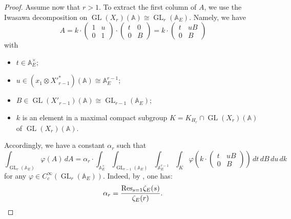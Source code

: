 \documentclass[10pt]{amsart}
\theoremstyle{plain}
\numberwithin{equation}{section}
\begin{document}
\begin{proof}
Assume now that $r>1$. To extract the first column of $A$, we  use the Iwasawa
decomposition on ${\operatorname{GL}}(X_r)({\mathbb{A}})\cong {\operatorname{GL}}_r({\mathbb{A}}_E)$. Namely, we have
  \[   
A = k \cdot\begin{pmatrix}
  1 & u \\
  0 & 1 \end{pmatrix}\cdot\begin{pmatrix}
  t & 0 \\
  0 & B \end{pmatrix} =  
  k \cdot  \begin{pmatrix}
  t & uB \\
  0 & B \end{pmatrix}    
\]
  with
  \begin{itemize}
  \item $t \in {\mathbb{A}}_E^{\times}$;  
  \item $u \in (x_1 \otimes {X'}_{r-1}^*)({\mathbb{A}})\cong {\mathbb{A}}_E^{r-1}$;
  \item $B \in {\operatorname{GL}}(X'_{r-1})({\mathbb{A}}) \cong {\operatorname{GL}}_{r-1}({\mathbb{A}}_E)$;
  \item $k$ is an element in a maximal compact subgroup $K = K_{H_r} \cap {\operatorname{GL}}(X_r)({\mathbb{A}})$  of ${\operatorname{GL}}(X_r)({\mathbb{A}})$. 
  \end{itemize} 
  Accordingly, we have a constant $\alpha_r$ such that
   \begin{equation} \label{E:alphar}
    \int_{{\operatorname{GL}}_r({\mathbb{A}}_E)} \varphi(A)  \,  dA =   \alpha_r  \cdot
    \int_{{\mathbb{A}}_E^{\times}} \int_{{\operatorname{GL}}_{r-1}({\mathbb{A}}_E)} \int_{{\mathbb{A}}_E^{r-1}}
    \int_K   \varphi \left( k \cdot \left(  \begin{matrix} t & uB \\
    0 & B \end{matrix} \right) \right) \,  dt  \, dB \, du \, dk 
\end{equation}
    for any $\varphi \in C^{\infty}_c({\operatorname{GL}}_r({\mathbb{A}}_E))$.  Indeed, by
    \cite[Lemma 9.1]{I2}, one has:
  \[  \alpha_r  = \frac{{\rm Res}_{s=1} \zeta_E(s)}{\zeta_E(r)}. \]
  \vskip 5pt
 

\end{proof}
\end{document}
